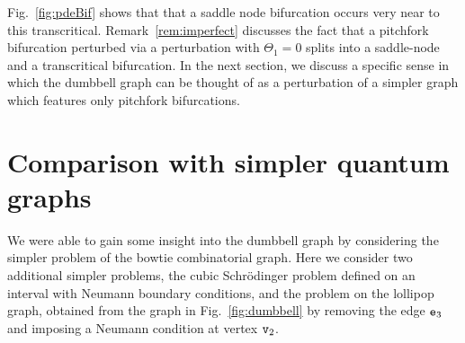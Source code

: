 \documentclass{article}
\numberwithin{equation}{section}
\numberwithin{figure}{section}
\begin{document}
\begin{rem}
Fig.~\ref{fig:pdeBif} shows that that a saddle node bifurcation occurs very near to this transcritical. Remark~\ref{rem:imperfect} discusses the fact that a pitchfork bifurcation perturbed via a perturbation with $\Theta_1=0$ splits into a saddle-node and a transcritical bifurcation. In the next section, we discuss a specific sense in which the dumbbell graph can be thought of as a perturbation of a simpler graph which features only pitchfork bifurcations.
\end{rem}
%

\section{Comparison with simpler quantum graphs}
\label{sec:singularPert}

We were able to gain some insight into the dumbbell graph by considering the simpler problem of the bowtie combinatorial graph. Here we consider two additional simpler problems, the cubic Schr\"odinger problem defined on an interval with Neumann boundary conditions, and the problem on the lollipop graph, obtained from the graph in Fig.~\ref{fig:dumbbell} by removing the edge $\mathtt{e}_3$ and imposing a Neumann condition at vertex $\mathtt{v}_2$. 
\end{document}
